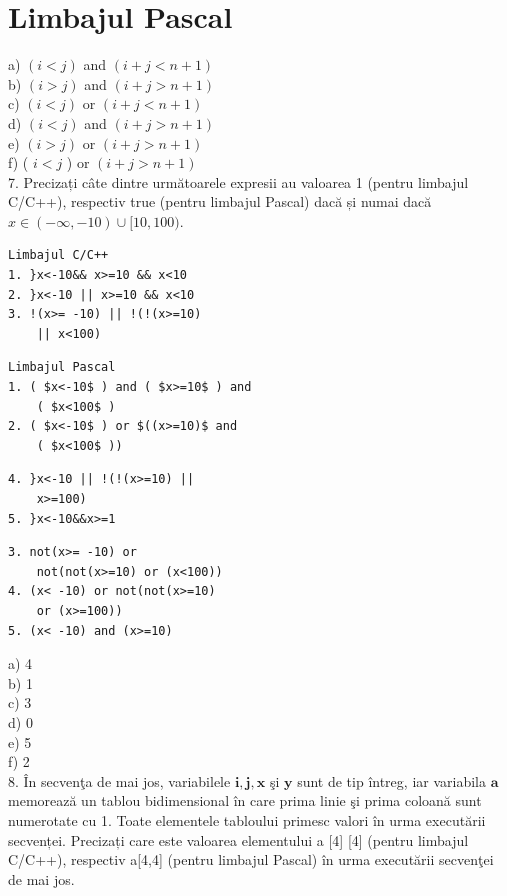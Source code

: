 \documentclass[10pt]{article}
\begin{document}
\section*{Limbajul Pascal}
a) $(i<j)$ and $(i+j<n+1)$\\
b) $(i>j)$ and $(i+j>n+1)$\\
c) $(i<j)$ or $(i+j<n+1)$\\
d) $(i<j)$ and $(i+j>n+1)$\\
e) $(i>j)$ or $(i+j>n+1)$\\
f) ( $i<j$ ) or $(i+j>n+1)$\\
7. Precizați câte dintre următoarele expresii au valoarea 1 (pentru limbajul C/C++), respectiv true (pentru limbajul Pascal) dacă și numai dacă $x \in(-\infty,-10) \cup[10,100)$.

\begin{verbatim}
Limbajul C/C++
1. }x<-10&& x>=10 && x<10
2. }x<-10 || x>=10 && x<10
3. !(x>= -10) || !(!(x>=10)
    || x<100)
\end{verbatim}

\begin{verbatim}
Limbajul Pascal
1. ( $x<-10$ ) and ( $x>=10$ ) and
    ( $x<100$ )
2. ( $x<-10$ ) or $((x>=10)$ and
    ( $x<100$ ))
\end{verbatim}

\begin{verbatim}
4. }x<-10 || !(!(x>=10) ||
    x>=100)
5. }x<-10&&x>=1
\end{verbatim}

\begin{verbatim}
3. not(x>= -10) or
    not(not(x>=10) or (x<100))
4. (x< -10) or not(not(x>=10)
    or (x>=100))
5. (x< -10) and (x>=10)
\end{verbatim}

a) 4\\
b) 1\\
c) 3\\
d) 0\\
e) 5\\
f) 2\\
8. În secvenţa de mai jos, variabilele $\mathbf{i}, \mathbf{j}, \mathbf{x}$ şi $\mathbf{y}$ sunt de tip întreg, iar variabila $\mathbf{a}$ memorează un tablou bidimensional în care prima linie şi prima coloană sunt numerotate cu 1. Toate elementele tabloului primesc valori în urma executării secvenței. Precizați care este valoarea elementului a [4] [4] (pentru limbajul C/C++), respectiv a[4,4] (pentru limbajul Pascal) în urma executării secvenţei de mai jos.
\end{document}
